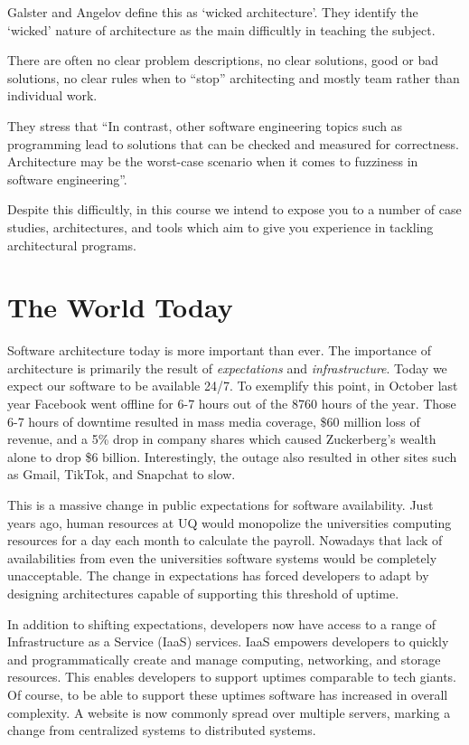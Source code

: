 Galster and Angelov \cite{wicked-architecture} define this as `wicked architecture'.
They identify the `wicked' nature of architecture as the main difficultly in teaching the subject.

\begin{definition}
There are often no clear problem descriptions, no clear solutions, good or bad solutions, no clear rules when to ``stop'' architecting
and mostly team rather than individual work.
\end{definition}

They stress that ``In contrast, other software engineering topics such as programming lead to solutions that can be checked and measured for correctness.
Architecture may be the worst-case scenario when it comes to fuzziness in software engineering''.

Despite this difficultly, in this course we intend to expose you to a number of case studies, architectures, and tools which aim to give you experience in tackling architectural programs.

\section{The World Today}
Software architecture today is more important than ever.
The importance of architecture is primarily the result of \textsl{expectations} and \textsl{infrastructure}.
Today we expect our software to be available 24/7.
To exemplify this point, in October last year Facebook went offline for 6-7 hours out of the 8760 hours of the year.
Those 6-7 hours of downtime resulted in mass media coverage, \$60 million loss of revenue,
and a 5\% drop in company shares which caused Zuckerberg's wealth alone to drop \$6 billion.
Interestingly, the outage also resulted in other sites such as Gmail, TikTok, and Snapchat to slow.

This is a massive change in public expectations for software availability.
Just  years ago,
human resources at UQ would monopolize the universities computing resources for a day each month to calculate the payroll.
Nowadays that lack of availabilities from even the universities software systems would be completely unacceptable.
The change in expectations has forced developers to adapt by designing architectures capable of supporting this threshold of uptime.

In addition to shifting expectations, developers now have access to a range of Infrastructure as a Service (IaaS) services.
IaaS empowers developers to quickly and programmatically create and manage computing, networking, and storage resources.
This enables developers to support uptimes comparable to tech giants.
Of course, to be able to support these uptimes software has increased in overall complexity.
A website is now commonly spread over multiple servers, marking a change from centralized systems to distributed systems.

